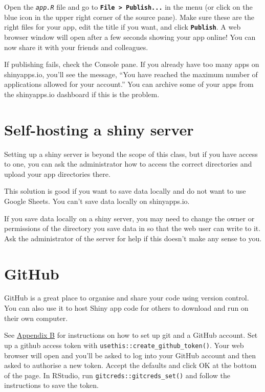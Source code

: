 \documentclass[
  oneside]{book}
\begin{document}
Open the \textit{\texttt{app.R}} file and go to \textbf{\texttt{File\ \textgreater{}\ Publish...}} in the menu (or click on the blue icon in the upper right corner of the source pane). Make sure these are the right files for your app, edit the title if you want, and click \textbf{\texttt{Publish}}. A web browser window will open after a few seconds showing your app online! You can now share it with your friends and colleagues.

\begin{info}
If publishing fails, check the Console pane. If you already have too many apps on shinyapps.io, you'll see the message, ``You have reached the maximum number of applications allowed for your account.'' You can archive some of your apps from the shinyapps.io dashboard if this is the problem.

\end{info}

\hypertarget{self-hosting-a-shiny-server}{%
\section{Self-hosting a shiny server}\label{self-hosting-a-shiny-server}}

Setting up a shiny server is beyond the scope of this class, but if you have access to one, you can ask the administrator how to access the correct directories and upload your app directories there.

This solution is good if you want to save data locally and do not want to use Google Sheets. You can't save data locally on shinyapps.io.

\begin{info}
If you save data locally on a shiny server, you may need to change the owner or permissions of the directory you save data in so that the web user can write to it. Ask the administrator of the server for help if this doesn't make any sense to you.

\end{info}

\hypertarget{github}{%
\section{GitHub}\label{github}}

GitHub is a great place to organise and share your code using version control. You can also use it to host Shiny app code for others to download and run on their own computer.

See \protect\hyperlink{setup-git}{Appendix B} for instructions on how to set up git and a GitHub account. Set up a github access token with \texttt{usethis::create\_github\_token}\texttt{()}. Your web browser will open and you'll be asked to log into your GitHub account and then asked to authorise a new token. Accept the defaults and click OK at the bottom of the page. In RStudio, run \texttt{gitcreds::gitcreds\_set}\texttt{()} and follow the instructions to save the token.
\end{document}
